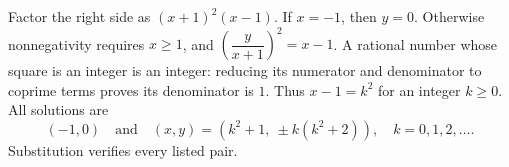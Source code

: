 Factor the right side as $(x+1)^2(x-1)$. If $x=-1$, then $y=0$. Otherwise nonnegativity requires $x\ge1$, and
$\left(\dfrac{y}{x+1}\right)^2=x-1$.
A rational number whose square is an integer is an integer: reducing its numerator and denominator to coprime terms proves its denominator is $1$. Thus $x-1=k^2$ for an integer $k\ge0$. All solutions are
\[
\boxed{(-1,0)\quad\text{and}\quad (x,y)=(k^2+1,\ \pm k(k^2+2)),\quad k=0,1,2,\ldots}.
\]
Substitution verifies every listed pair.
